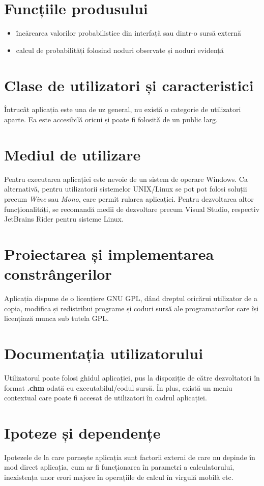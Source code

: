 \documentclass{scrreprt}
\begin{document}
\section{Funcțiile produsului}
\begin{itemize}
	\item încărcarea valorilor probabilistice din interfață sau dintr-o sursă externă
	\item calcul de probabilități folosind noduri observate și noduri evidență
\end{itemize}

\section{Clase de utilizatori și caracteristici}
Întrucât aplicația este una de uz general, nu există o categorie de utilizatori aparte. Ea este accesibilă oricui și poate fi folosită de un public larg.

\section{Mediul de utilizare}
Pentru executarea aplicației este nevoie de un sistem de operare Windows. Ca alternativă, pentru utilizatorii sistemelor UNIX/Linux se pot pot folosi soluții precum \textit{Wine} sau \textit{Mono}, care permit rularea aplicației. Pentru dezvoltarea altor funcționalități, se recomandă medii de dezvoltare precum Visual Studio, respectiv JetBrains Rider pentru sisteme Linux.

\section{Proiectarea și implementarea constrângerilor}
Aplicația dispune de o licențiere GNU GPL, dând dreptul oricărui utilizator de a copia, modifica și redistribui programe și coduri sursă ale programatorilor care își licențiază munca sub tutela GPL.

\section{Documentația utilizatorului}
Utilizatorul poate folosi ghidul aplicației, pus la dispoziție de către dezvoltatori în format \textbf{.chm} odată cu executabilul/codul sursă. În plus, există un meniu contextual care poate fi accesat de utilizatori în cadrul aplicației.

\section{Ipoteze și dependențe}
Ipotezele de la care pornește aplicația sunt factorii externi de care nu depinde în mod direct aplicația, cum ar fi funcționarea în parametri a calculatorului, inexistența unor erori majore în operațiile de calcul în virgulă mobilă etc.
\end{document}
